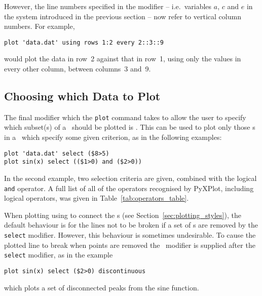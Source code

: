 However, the line numbers specified in the  modifier -- i.e.\
variables $a$, $c$ and $e$ in the system introduced in the previous section --
now refer to vertical column numbers. For example,

\begin{verbatim}
plot 'data.dat' using rows 1:2 every 2::3::9
\end{verbatim}

\noindent would plot the data in row~2 against that in row~1, using only the
values in every other column, between columns~3 and~9.

\subsection{Choosing which Data to Plot}
\label{sec:select_modifier}

The final modifier which the {\tt plot} command takes to allow the user to
specify which subset(s) of a \datafile\ should be plotted is .
This can be used to plot only those \datapoint s in a \datafile\ which specify
some given criterion, as in the following examples:

\begin{verbatim}
plot 'data.dat' select ($8>5)
plot sin(x) select (($1>0) and ($2>0))
\end{verbatim}

\noindent In the second example, two selection criteria are given, combined
with the logical {\tt and} operator. A full list of all of the operators
recognised by PyXPlot, including logical operators, was given in
Table~\ref{tab:operators_table}.

When plotting using  to connect the \datapoint s (see
Section~\ref{sec:plotting_styles}), the default behaviour is for the lines not
to be broken if a set of \datapoint s are removed by the {\tt select} modifier.
However, this behaviour is sometimes undesirable.  To cause the plotted line to
break when points are removed the \indmodt{discontinuous}\ modifier is supplied
after the {\tt select} modifier, as in the example

\begin{verbatim}
plot sin(x) select ($2>0) discontinuous
\end{verbatim}

\noindent which plots a set of disconnected peaks from the sine function.



